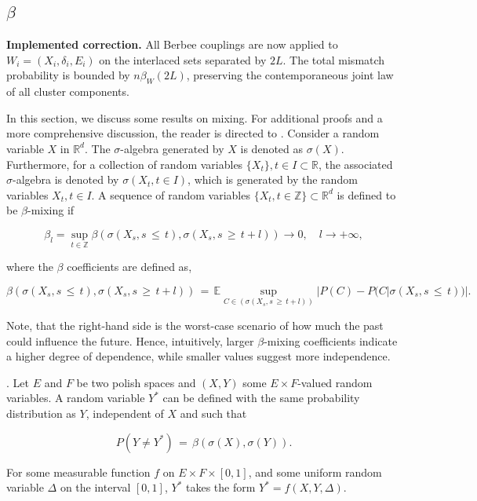 \documentclass[twoside,11pt]{article}
\makeatletter
\newcommand{\implementedchange}[1]{%
  \par\smallskip\noindent
  {\color{revisionred}\textbf{Implemented correction.} #1}%
  \par\smallskip}
\newcommand{\discardlabel}[1]{}
\newcommand{\discardtwo}[2]{}
\newcommand{\legacyref}[1]{\textup{[source ref.]}}
\newcommand{\legacyeqref}[1]{\textup{[source equation]}}
\newenvironment{legacycomparison}{%
  \begingroup\color{legacygray}%
  \let\label\discardlabel
  \let\originallabel\discardlabel
  \let\ref\legacyref
  \let\pageref\legacyref
  \let\eqref\legacyeqref
  \let\cref\legacyref
  \let\Cref\legacyref
  \let\autoref\legacyref
  \let\aliasref\discardtwo
}{\endgroup}
\newcommand{\aliasref}[2]{%
  \@ifundefined{r@#2}{}{%
    \expandafter\let\csname r@#1\expandafter\endcsname\csname r@#2\endcsname}}
\makeatother
\begin{document}
\begin{legacycomparison}
\subsection{$\beta$}
\implementedchange{All Berbee couplings are now applied to $W_i=(X_i,\delta_i,E_i)$ on the interlaced sets separated by $2L$. The total mismatch probability is bounded by $n\beta_W(2L)$, preserving the contemporaneous joint law of all cluster components.}
\label{beta_mix_intro}
In this section, we discuss some results on mixing. For additional proofs and a more comprehensive discussion, the reader is directed to \cite{doukhan2012mixing}. Consider a random variable \(X\) in \(\mathbb{R}^d\). The \(\sigma\)-algebra generated by \(X\) is denoted as \(\sigma(X)\). Furthermore, for a collection of random variables \( \{X_t\}, t \in I \subset \mathbb{R} \), the associated \(\sigma\)-algebra is denoted by \(\sigma(X_t, t \in I)\), which is generated by the random variables \( X_t, t \in I \). A sequence of random variables \( \{X_t, t \in \mathbb{Z}\} \subset \mathbb{R}^d \) is defined to be \(\beta\)-mixing if


\[
\beta_l = \sup_{t \in \mathbb{Z}} \beta (\sigma (X_s, s \,\leq\, t), \sigma (X_s, s \,\geq\, t + l)) \rightarrow 0, \quad l \rightarrow +\infty,
\]

where the \(\beta\) coefficients are defined as,

\[
\beta(\sigma(X_s, s \,\leq\, t), \sigma(X_s, s \,\geq\, t + l)) \,=\, \mathbb{E} \sup_{C \in (\sigma(X_s, s\,\geq\, t+l))} |P(C) - P(C | \sigma(X_s, s \,\leq\, t))|.
\]

Note, that the right-hand side is the worst-case scenario of how much the past could influence the future. Hence, intuitively, larger $\beta$-mixing coefficients indicate a higher degree of dependence, while smaller values suggest more independence.


\begin{theorem}.
\label{thm_beta_mix}Let \(E\) and \(F\) be two polish spaces and \((X, Y)\) some \(E \times F\)-valued random variables. A random variable \(Y^*\) can be defined with the same probability distribution as \(Y\), independent of \(X\) and such that

\[
P(Y \neq Y^*) \,=\, \beta(\sigma(X), \sigma(Y)).
\]

For some measurable function \(f\) on \(E \times F \times [0,1]\), and some uniform random variable \(\Delta\) on the interval \([0,1]\), \(Y^*\) takes the form \(Y^* = f(X, Y, \Delta)\).    
\end{theorem}


\end{legacycomparison}
\end{document}
